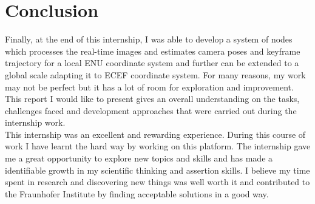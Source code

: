 \chapter{Conclusion}
\label{ch:conclusion}
Finally, at the end of this internship, I was able to develop a system of nodes which processes the real-time images and estimates camera poses and keyframe trajectory for a local ENU coordinate system and further can be extended to a global scale adapting it to ECEF coordinate system. For many reasons, my work may not be perfect but it has a lot of room for exploration and improvement. This report I would like to present gives an overall understanding on the tasks, challenges faced and development approaches that were carried out during the internship work. \\ 

This internship was an excellent and rewarding experience. During this course of work I have learnt the hard way by working on this platform. The internship gave me a great opportunity to explore new topics and skills and has made a identifiable growth in my scientific thinking and assertion skills. I believe my time spent in research and discovering new things was well worth it and contributed to the Fraunhofer Institute by finding acceptable solutions in a good way.